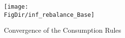 \hypertarget{inf_rebalance_Base}{}
\begin{figure}[tbp]
\centerline{\texttt{[image: \\FigDir/inf\_rebalance\_Base]}}
\caption{Convergence of the Consumption Rules}
\label{fig:inf_dFunc}
\end{figure}